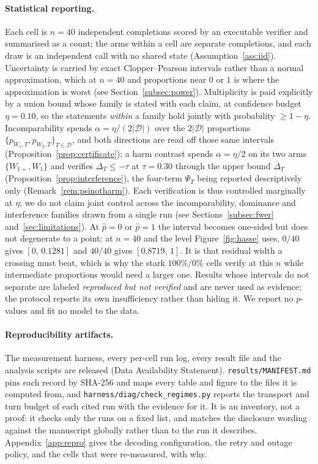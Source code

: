 \documentclass[11pt]{article}
\theoremstyle{plain}
\theoremstyle{definition}
\theoremstyle{remark}
\newcommand{\Dcal}{\mathcal{D}}
\begin{document}
\paragraph{Statistical reporting.}
Each cell is $n=40$ independent completions scored by an executable verifier and summarised as a
count; the arms within a cell are separate completions, and each draw is an independent call with
no shared state (Assumption~\ref{ass:iid}). Uncertainty is carried by exact Clopper--Pearson
intervals rather than a normal approximation, which at $n=40$ and proportions near $0$ or $1$ is
where the approximation is worst (see Section~\ref{subsec:power}). Multiplicity is paid explicitly by a union
bound whose family is stated with each claim, at confidence budget $\eta = 0.10$, so the statements
\emph{within} a family hold jointly with probability $\ge 1-\eta$. Incomparability spends
$\alpha = \eta/(2|\Dcal|)$ over the $2|\Dcal|$ proportions $\{p_{W_1,T}, p_{W_2,T}\}_{T\in \Dcal}$,
and both directions are read off those same intervals (Proposition~\ref{prop:certificate}); a harm
contrast spends $\alpha = \eta/2$ on its two arms $\{W_{1+},W_1\}$ and verifies $\Delta_T \le -\tau$
at $\tau = 0.30$ through the upper bound $\overline\Delta_T$
(Proposition~\ref{prop:interference}), the four-term $\Psi_T$ being reported descriptively only
(Remark~\ref{rem:psinotharm}). Each verification is thus controlled marginally at $\eta$; we do not
claim joint control across the incomparability, dominance and interference families drawn from a
single run (see Sections~\ref{subsec:fwer} and~\ref{sec:limitations}). At $\hat p=0$ or $\hat p=1$ the interval
becomes one-sided but does not degenerate to a point: at $n=40$ and the level
Figure~\ref{fig:hasse} uses, $0/40$ gives $[0,\,0.1281]$ and $40/40$ gives $[0.8719,\,1]$. It is that
residual width a crossing must beat, which is why the stark $100\%/0\%$ cells verify at this $n$
while intermediate proportions would need a larger one. Results whose intervals do not separate are
labeled \emph{reproduced but not verified} and are never used as evidence; the protocol reports its
own insufficiency rather than hiding it. We report no $p$-values and fit no model to the data.

\paragraph{Reproducibility artifacts.}
The measurement harness, every per-cell run log, every result file and the analysis scripts are
released (Data Availability Statement). \texttt{results/MANIFEST.md} pins each record by SHA-256
and maps every table and figure to the files it is computed from, and
\texttt{harness/diag/check\_regimes.py} reports the transport and turn budget of each cited run
with the evidence for it. It is an inventory, not a proof: it checks only the runs on a fixed list,
and matches the disclosure wording against the manuscript globally rather than to the run it
describes. Appendix~\ref{app:repro} gives the decoding configuration, the
retry and outage policy, and the cells that were re-measured, with why.
\end{document}
